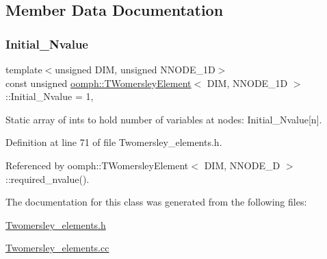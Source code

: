 \subsection{Member Data Documentation}
\mbox{\label{classoomph_1_1TWomersleyElement_a58a6e5ed2d7fa22414e8878204886fbf}} 
\subsubsection{\texorpdfstring{Initial\+\_\+\+Nvalue}{Initial\_Nvalue}}
{\footnotesize\ttfamily template$<$unsigned D\+IM, unsigned N\+N\+O\+D\+E\+\_\+1D$>$ \\
const unsigned \hyperlink{classoomph_1_1TWomersleyElement}{oomph\+::\+T\+Womersley\+Element}$<$ D\+IM, N\+N\+O\+D\+E\+\_\+1D $>$\+::Initial\+\_\+\+Nvalue = 1\hspace{0.3cm}{\ttfamily [static]}, {\ttfamily [private]}}



Static array of ints to hold number of variables at nodes\+: Initial\+\_\+\+Nvalue\mbox{[}n\mbox{]}. 



Definition at line 71 of file Twomersley\+\_\+elements.\+h.



Referenced by oomph\+::\+T\+Womersley\+Element$<$ D\+I\+M, N\+N\+O\+D\+E\+\_\+D $>$\+::required\+\_\+nvalue().



The documentation for this class was generated from the following files\+:\begin{DoxyCompactItemize}
\item 
\hyperlink{Twomersley__elements_8h}{Twomersley\+\_\+elements.\+h}\item 
\hyperlink{Twomersley__elements_8cc}{Twomersley\+\_\+elements.\+cc}\end{DoxyCompactItemize}
